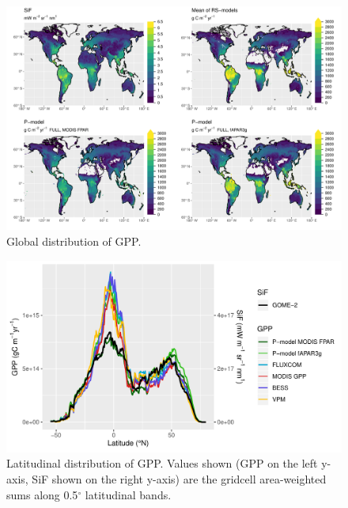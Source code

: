 \documentclass[gmd, manuscript]{copernicus}
\begin{document}
 \begin{figure}[!ht]
\includegraphics[width=\textwidth]{fig/maps_comparison.pdf}
\caption{Global distribution of GPP. }
    \label{fig:gpp_global}
\end{figure}


 \begin{figure}[t]
\includegraphics[width=12cm]{fig/gpp_by_latitude.pdf}
    \caption{Latitudinal distribution of GPP. Values shown (GPP on the left y-axis, SiF shown on the right y-axis) are the gridcell area-weighted sums along 0.5$^{\circ}$ latitudinal bands.}
    \label{fig:gpp_by_lat}
\end{figure}
\end{document}
